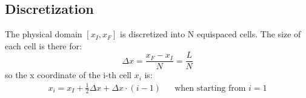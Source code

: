 \documentclass[11pt, a4paper]{article}
\begin{document}
\subsection{Discretization}
The physical domain $\left[x_I,x_F\right]$ is discretized into N equispaced cells. The size of each cell is there for:
\begin{equation}
    \Delta x=\frac{x_F-x_I}{N}=\frac{L}{N}
\end{equation}
so the x coordinate of the i-th cell $x_i$ is:
\begin{equation}
    \begin{matrix}
        \displaystyle x_i=x_I+\frac{1}{2}\Delta x+\Delta x\cdot\left(i-1\right) && \text{when starting from $i=1$}
    \end{matrix}
\end{equation}
\end{document}
